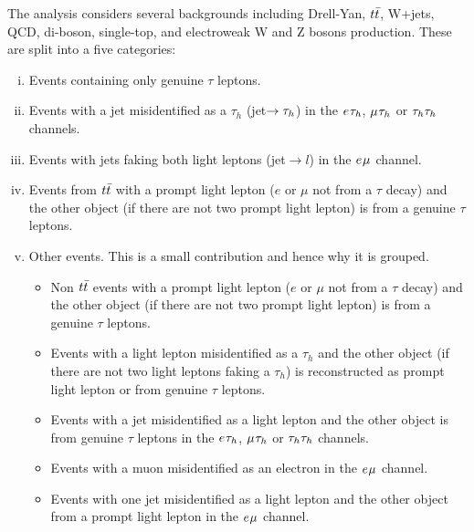 The analysis considers several backgrounds including Drell-Yan, $t\bar{t}$, W+jets, QCD, di-boson, single-top, and electroweak W and Z bosons production.
These are split into a five categories:
\begin{enumerate}[i)]
  \item Events containing only genuine $\tau$ leptons.
  \item Events with a jet misidentified as a $\tau_h$ (jet$\rightarrow \tau_{h}$) in the $e_{}\tau_{h}$, $\mu_{}\tau_{h}$ or $\tau_{h}\tau_{h}$ channels.
  \item Events with jets faking both light leptons (jet$\rightarrow l$) in the $e_{}\mu_{}$ channel.
  \item Events from $t\bar{t}$ with a prompt light lepton ($e$ or $\mu$ not from a $\tau$ decay) and the other object (if there are not two prompt light lepton) is from a genuine $\tau$ leptons.
  \item Other events. This is a small contribution and hence why it is grouped.
  \begin{itemize}
    \item Non $t\bar{t}$ events with a prompt light lepton ($e$ or $\mu$ not from a $\tau$ decay) and the other object (if there are not two prompt light lepton) is from a genuine $\tau$ leptons.
    \item Events with a light lepton misidentified as a $\tau_h$ and the other object (if there are not two light leptons faking a $\tau_h$) is reconstructed as prompt light lepton or from genuine $\tau$ leptons. 
    \item Events with a jet misidentified as a light lepton and the other object is from genuine $\tau$ leptons in the $e_{}\tau_{h}$, $\mu_{}\tau_{h}$ or $\tau_{h}\tau_{h}$ channels.
    \item Events with a muon misidentified as an electron in the $e_{}\mu_{}$ channel.
    \item Events with one jet misidentified as a light lepton and the other object from a prompt light lepton in the $e_{}\mu_{}$ channel.
   \end{itemize}
\end{enumerate}

